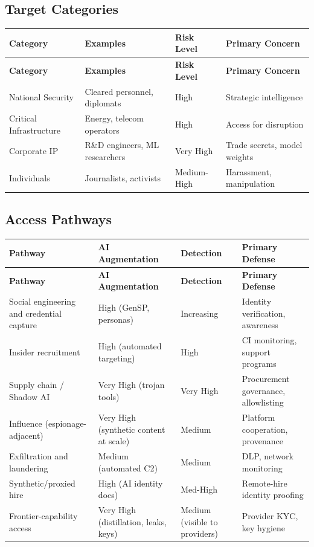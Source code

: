 \documentclass[11pt,letterpaper]{article}
\begin{document}
\subsection*{Target Categories}

{\small
\begin{longtable}{L{3.5cm}L{3.5cm}L{2cm}L{3.5cm}}
\toprule
\textbf{Category} & \textbf{Examples} & \textbf{Risk Level} & \textbf{Primary Concern} \\
\midrule
\endfirsthead
\toprule
\textbf{Category} & \textbf{Examples} & \textbf{Risk Level} & \textbf{Primary Concern} \\
\midrule
\endhead
National Security & Cleared personnel, diplomats & High & Strategic intelligence \\*
Critical Infrastructure & Energy, telecom operators & High & Access for disruption \\
Corporate IP & R\&D engineers, ML researchers & Very High & Trade secrets, model weights \\*
Individuals & Journalists, activists & Medium-High & Harassment, manipulation \\
\bottomrule
\end{longtable}}

\subsection*{Access Pathways}

{\small
\begin{longtable}{L{4cm}L{4.3cm}L{2.8cm}L{4.4cm}}
\toprule
\textbf{Pathway} & \textbf{AI Augmentation} & \textbf{Detection} & \textbf{Primary Defense} \\
\midrule
\endfirsthead
\toprule
\textbf{Pathway} & \textbf{AI Augmentation} & \textbf{Detection} & \textbf{Primary Defense} \\
\midrule
\endhead
Social engineering and credential capture & High (GenSP, personas) & Increasing & Identity verification, awareness \\*
Insider recruitment & High (automated targeting) & High & CI monitoring, support programs \\
Supply chain / Shadow AI & Very High (trojan tools) & Very High & Procurement governance, allowlisting \\
Influence (espionage-adjacent) & Very High (synthetic content at scale) & Medium & Platform cooperation, provenance \\
Exfiltration and laundering & Medium (automated C2) & Medium & DLP, network monitoring \\
Synthetic/proxied hire & High (AI identity docs) & Med-High & Remote-hire identity proofing \\
Frontier-capability access & Very High (distillation, leaks, keys) & Medium (visible to providers) & Provider KYC, key hygiene \\
\bottomrule
\end{longtable}}
\end{document}

